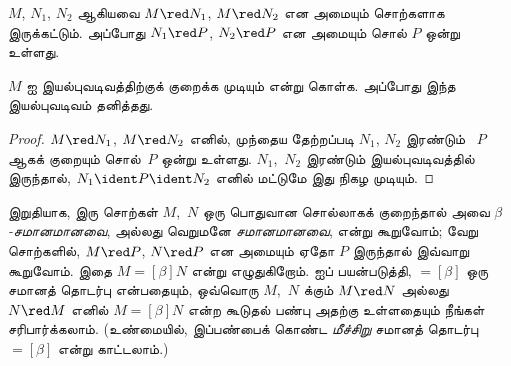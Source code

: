 \documentclass[../../../include/open-logic-section]{subfiles}
\begin{document}

\begin{thm}
$M$, $N_1$, $N_2$ ஆகியவை $M \red N_1$, $M \red N_2$ என அமையும் சொற்களாக
இருக்கட்டும். அப்போது $N_1 \red P$, $N_2 \red P$ என அமையும் சொல் $P$ ஒன்று
உள்ளது.
\end{thm}

\begin{cor}
$M$ ஐ இயல்புவடிவத்திற்குக் குறைக்க முடியும் என்று கொள்க. அப்போது இந்த
இயல்புவடிவம் தனித்தது.
\end{cor}

\begin{proof}
$M \red N_1$, $M \red N_2$ எனில், முந்தைய தேற்றப்படி $N_1$, $N_2$ இரண்டும்
~$P$ ஆகக் குறையும் சொல்~$P$ ஒன்று உள்ளது. $N_1$,~$N_2$ இரண்டும்
இயல்புவடிவத்தில் இருந்தால், $N_1 \ident P \ident N_2$ எனில் மட்டுமே இது
நிகழ முடியும்.
\end{proof}

இறுதியாக, இரு சொற்கள் $M$,~$N$ ஒரு பொதுவான சொல்லாகக் குறைந்தால் அவை
\emph{$\beta$-சமானமானவை}, அல்லது வெறுமனே \emph{சமானமானவை}, என்று கூறுவோம்;
வேறு சொற்களில், $M \red P$, $N \red P$ என அமையும் ஏதோ $P$ இருந்தால் இவ்வாறு
கூறுவோம். இதை $M \equal[\beta] N$ என்று எழுதுகிறோம்.
 ஐப் பயன்படுத்தி, $\equal[\beta]$ ஒரு சமானத் தொடர்பு
என்பதையும், ஒவ்வொரு $M$,~$N$ க்கும் $M \red N$ அல்லது $N \red M$ எனில்
$M \equal[\beta] N$ என்ற கூடுதல் பண்பு அதற்கு உள்ளதையும் நீங்கள் சரிபார்க்கலாம்.
(உண்மையில், இப்பண்பைக் கொண்ட \emph{மீச்சிறு} சமானத் தொடர்பு
$\equal[\beta]$ என்று காட்டலாம்.)
\end{document}
